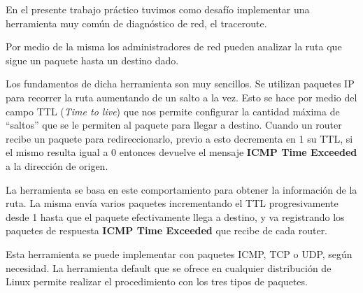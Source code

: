 En el presente trabajo práctico tuvimos como desafío implementar una herramienta muy común de diagnóstico de red, el traceroute.

Por medio de la misma los administradores de red pueden analizar la ruta que sigue un paquete hasta un destino dado.

Los fundamentos de dicha herramienta son muy sencillos.
Se utilizan paquetes IP para recorrer la ruta aumentando de un salto a la vez.
Esto se hace por medio del campo TTL (\textit{Time to live}) que nos permite configurar la cantidad máxima de ``saltos'' que se le permiten al paquete para llegar a destino.
Cuando un router recibe un paquete para redireccionarlo, previo a esto decrementa en 1 su TTL, si el mismo resulta igual a 0 entonces devuelve el mensaje \textbf{ICMP Time Exceeded} a la dirección de origen.

La herramienta se basa en este comportamiento para obtener la información de la ruta. La misma envía varios paquetes incrementando el TTL progresivamente desde 1 hasta que el paquete efectivamente llega a destino, y va registrando los paquetes de respuesta \textbf{ICMP Time Exceeded} que recibe de cada router.

Esta herramienta se puede implementar con paquetes ICMP, TCP o UDP, según necesidad. La herramienta default que se ofrece en cualquier distribución de Linux permite realizar el procedimiento con los tres tipos de paquetes.
